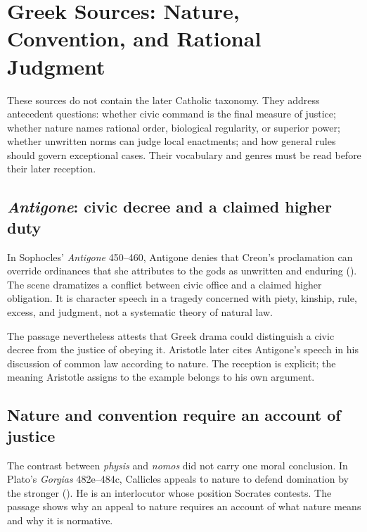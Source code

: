\section{Greek Sources: Nature, Convention, and Rational Judgment}

These sources do not contain the later Catholic taxonomy. They address antecedent questions: whether civic command is the final measure of justice; whether nature names rational order, biological regularity, or superior power; whether unwritten norms can judge local enactments; and how general rules should govern exceptional cases. Their vocabulary and genres must be read before their later reception.

\subsection{\emph{Antigone}: civic decree and a claimed higher duty}

In Sophocles' \emph{Antigone} 450--460, Antigone denies that Creon's proclamation can override ordinances that she attributes to the gods as unwritten and enduring (). The scene dramatizes a conflict between civic office and a claimed higher obligation. It is character speech in a tragedy concerned with piety, kinship, rule, excess, and judgment, not a systematic theory of natural law.

The passage nevertheless attests that Greek drama could distinguish a civic decree from the justice of obeying it. Aristotle later cites Antigone's speech in his discussion of common law according to nature. The reception is explicit; the meaning Aristotle assigns to the example belongs to his own argument.

\subsection{Nature and convention require an account of justice}

The contrast between \emph{physis} and \emph{nomos} did not carry one moral conclusion. In Plato's \emph{Gorgias} 482e--484c, Callicles appeals to nature to defend domination by the stronger (). He is an interlocutor whose position Socrates contests. The passage shows why an appeal to nature requires an account of what nature means and why it is normative.

